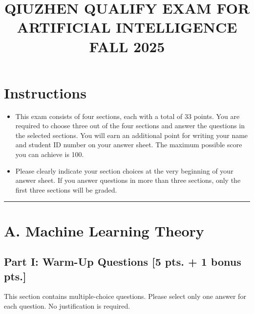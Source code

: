 \documentclass[11pt,a4paper]{article}
\title{\textbf{QIUZHEN QUALIFY EXAM FOR ARTIFICIAL INTELLIGENCE}\\[0.5em]\Large FALL 2025}
\date{}
\author{}
\begin{document}
\maketitle
\vspace{-3em}

\section*{Instructions}
\begin{itemize}
    \item This exam consists of four sections, each with a total of 33 points. You are required to choose three out of the four sections and answer the questions in the selected sections. You will earn an additional point for writing your name and student ID number on your answer sheet. The maximum possible score you can achieve is 100.
    \item Please clearly indicate your section choices at the very beginning of your answer sheet. If you answer questions in more than three sections, only the first three sections will be graded.
\end{itemize}

\noindent\rule{\linewidth}{0.4pt}

\section*{A. Machine Learning Theory}

\subsection*{Part I: Warm-Up Questions [5 pts. + 1 bonus pts.]}
This section contains multiple-choice questions. Please select only one answer for each question. No justification is required.
\end{document}
